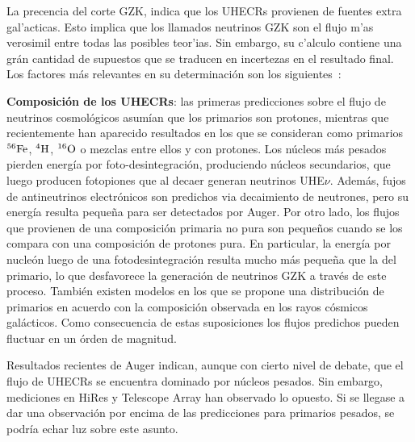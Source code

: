 	La precencia del corte GZK, indica que los UHECRs provienen de fuentes extra gal'acticas.
	Esto implica que los llamados neutrinos GZK son el flujo m'as verosimil entre todas las posibles teor'ias. 
	Sin embargo, su c'alculo contiene una gr\'an cantidad de supuestos que se traducen en incertezas en el resultado final.
	Los factores m\'as relevantes en su determinaci\'on son los siguientes~\cite{cite:nuEngel,cite:nuAve,cite:nuAhlers1,cite:nuAllard1,cite:nuYuksel}:
	
	\textbf{Composici\'on de los UHECRs}: las primeras predicciones sobre el flujo de neutrinos cosmol\'ogicos asum\'ian que los primarios son protones, mientras que recientemente han aparecido resultados en los que se consideran como primarios $^{56}{\rm Fe}$, $^{4}{\rm H}$, $^{16}{\rm O}$ o mezclas entre ellos y con protones\cite{cite:nuAve,cite:nuHooper}.
	Los n\'ucleos m\'as pesados pierden energ\'ia por foto-desintegraci\'on, produciendo n\'ucleos secundarios, que luego producen fotopiones que al decaer generan neutrinos UHE$\nu$.
	Adem\'as, fujos de antineutrinos electr\'onicos son predichos via decaimiento de neutrones\cite{cite:nuFeComposition}, pero su energ\'ia resulta peque\~na para ser detectados por Auger.
	Por otro lado, los flujos que provienen de una composici\'on primaria no pura son peque\~nos cuando se los compara con una composici\'on de protones pura\cite{cite:nuHooper}.
	En particular, la energ\'ia por nucle\'on luego de una fotodesintegraci\'on resulta mucho m\'as peque\~na que la del primario, lo que desfavorece la generaci\'on de neutrinos GZK a trav\'es de este proceso.
	Tambi\'en existen modelos en los que se propone una distribuci\'on de primarios en acuerdo con la composici\'on observada en los rayos c\'osmicos gal\'acticos\cite{cite:nuAllard1}.
	Como consecuencia de estas suposiciones los flujos predichos pueden fluctuar en un \'orden de magnitud.
	 
	Resultados recientes de Auger indican, aunque con cierto nivel de debate, que el flujo de UHECRs se encuentra dominado por n\'ucleos pesados\cite{cite:augerComposition}.
	Sin embargo, mediciones en HiRes y Telescope Array\cite{cite:taComposition} han observado lo opuesto.
	Si se llegase a dar una observaci\'on por encima de las predicciones para primarios pesados, se podr\'ia echar luz sobre este asunto.
	 
